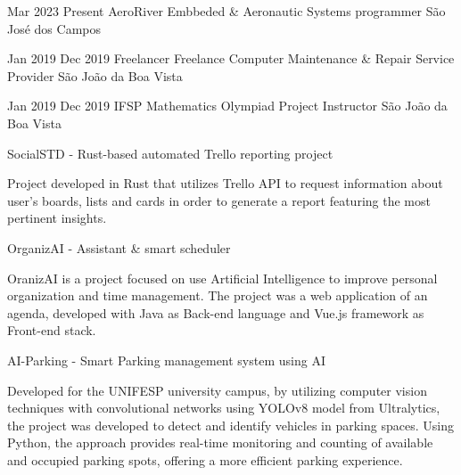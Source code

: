 {Mar 2023}
{Present}
{AeroRiver}
{Embbeded \& Aeronautic Systems programmer}
{São José dos Campos}
{
\jbegin
\jend
}

{Jan 2019}
{Dec 2019}
{Freelancer}
{Freelance Computer Maintenance \& Repair Service Provider}
{São João da Boa Vista}
{
\jbegin
\jend
}

{Jan 2019}
{Dec 2019}
{IFSP}
{Mathematics Olympiad Project Instructor}
{São João da Boa Vista}
{
\jbegin
\jend
}

{SocialSTD - Rust-based automated Trello reporting project}
{
\jbegin
    \item{
            Project developed in Rust that utilizes Trello API to request information about 
            user's boards, lists and cards in order to generate a report featuring the most pertinent insights.
         }
\jend
}

{OrganizAI - Assistant \& smart scheduler}
{
\jbegin
    \item{
            OranizAI is a project focused on use Artificial Intelligence to improve personal
            organization and time management. The project was a web application of an agenda, developed with Java
            as Back-end language and Vue.js framework as Front-end stack.
         }
\jend
}

{AI-Parking - Smart Parking management system using AI}
{
\jbegin
    \item{
            Developed for the UNIFESP university campus, by utilizing computer vision techniques with convolutional
            networks using YOLOv8 model from Ultralytics, the project was developed to detect and identify
            vehicles in parking spaces. Using Python, the approach provides real-time
            monitoring and counting of available and occupied parking spots, offering a more efficient parking experience.
         }
\jend
}

